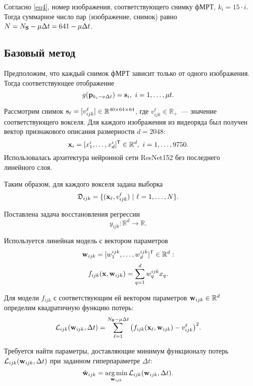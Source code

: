 \documentclass[a4paper, 12pt]{article}
\begin{document}
	Согласно \eqref{eq4}, номер изображения, соответствующего снимку фМРТ, $k_i = 15 \cdot i$.
	Тогда суммарное число пар (изображение, снимок) равно $N = N_{\mathbf{S}} - \mu \Delta t = 641 - \mu \Delta t$.

\subsection{Базовый метод}

	Предположим, что каждый снимок фМРТ зависит только от одного изображения. Тогда соответствующее
	отображение
	\begin{equation}
		\label{eq5}
		g(\mathbf{p}_{k_i - \nu \Delta t}) = \mathbf{s}_i, \ i = 1, \ldots, \mu t.
	\end{equation}

	Рассмотрим снимок $\mathbf{s}_{\ell} = [v^{\ell}_{ijk}] \in \mathbb{R}^{40 \times 64 \times 64}$,
	где $v^{\ell}_{ijk} \in \mathbb{R}_+$~--- значение соответствующего вокселя.
	Для каждого изображения из видеоряда был получен вектор признакового описания
	размерности $d = 2048$:
	\[ \mathbf{x}_i = [x^i_1, \ldots, x^i_{d}]^{\mathsf{T}} \in \mathbb{R}^{d}, \ i = 1, \ldots, 9750. \]
	Использовалась архитектура нейронной сети ResNet152 без последнего линейного слоя.
	
	Таким образом, для каждого вокселя задана выборка
	\[ \mathfrak{D}_{ijk} = \{(\mathbf{x}_{\ell}, v^{\ell}_{ijk}) \ | \ {\ell} = 1, \ldots, N \}. \]

	Поставлена задача восстановления регрессии
	\begin{equation}
		\label{eq6}
		y_{ijk}: \mathbb{R}^{d} \to \mathbb{R}.
	\end{equation}
	
	Используется линейная модель с вектором параметров 
	\[ \mathbf{w}_{ijk} = [w^{ijk}_1, \ldots, w^{ijk}_{d}]^{\mathsf{T}} \in \mathbb{R}^{d}: \]
	\begin{equation}
		\label{eq7}
		f_{ijk}(\mathbf{x}, \mathbf{w}_{ijk}) = \sum\limits_{q = 1}^{d} w^{ijk}_q x_q.
	\end{equation}

	Для модели $f_{ijk}$ с соответствующим ей вектором параметров $\mathbf{w}_{ijk} \in \mathbb{R}^{d}$
	определим квадратичную функцию потерь:
	\begin{equation}
		\label{eq8}
		\mathcal{L}_{ijk}(\mathbf{w}_{ijk}, \Delta t) = \sum\limits_{\ell = 1}^{N_{\mathbf{S}} - \mu \Delta t} \big(f_{ijk}(\mathbf{x}_{\ell}, \mathbf{w}_{ijk}) - v^{\ell}_{ijk}\big)^2.
	\end{equation}

	Требуется найти параметры, доставляющие минимум функционалу потерь $\mathcal{L}_{ijk}(\mathbf{w}_{ijk}, \Delta t)$
	при заданном гиперпараметре $\Delta t$:
	\begin{equation}
		\label{eq9}
		\hat{\mathbf{w}}_{ijk} = \operatorname*{arg\,min}_{\mathbf{w}_{ijk}} \mathcal{L}_{ijk}(\mathbf{w}_{ijk}, \Delta t).
	\end{equation}
\end{document}
